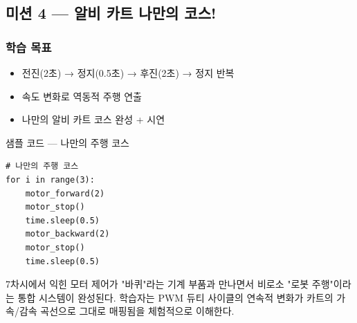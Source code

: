 \subsection{미션 4 --- 알비 카트 나만의 코스!}
\label{subsec:ch08-m4}

\begin{storybox}
\end{storybox}

\subsubsection*{학습 목표}
\begin{itemize}[leftmargin=1.4em]
  \item 전진(2초) → 정지(0.5초) → 후진(2초) → 정지 반복
  \item 속도 변화로 역동적 주행 연출
  \item 나만의 알비 카트 코스 완성 + 시연
\end{itemize}

\begin{labbox}{샘플 코드 --- 나만의 주행 코스}
\begin{verbatim}
# 나만의 주행 코스
for i in range(3):
    motor_forward(2)
    motor_stop()
    time.sleep(0.5)
    motor_backward(2)
    motor_stop()
    time.sleep(0.5)
\end{verbatim}
\end{labbox}

\begin{summary}[8차시 요약]
7차시에서 익힌 모터 제어가 "바퀴"라는 기계 부품과 만나면서 비로소
"로봇 주행"이라는 통합 시스템이 완성된다. 학습자는 PWM 듀티 사이클의
연속적 변화가 카트의 가속/감속 곡선으로 그대로 매핑됨을 체험적으로
이해한다.
\end{summary}
